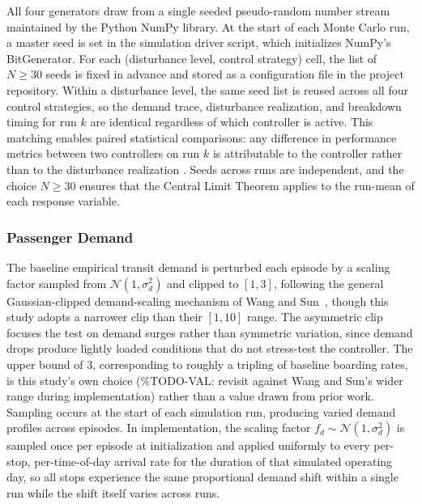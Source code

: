 All four generators draw from a single seeded pseudo-random number stream maintained by the Python NumPy library. At the start of each Monte Carlo run, a master seed is set in the simulation driver script, which initializes NumPy's BitGenerator. For each (disturbance level, control strategy) cell, the list of $N \geq 30$ seeds is fixed in advance and stored as a configuration file in the project repository. Within a disturbance level, the same seed list is reused across all four control strategies, so the demand trace, disturbance realization, and breakdown timing for run $k$ are identical regardless of which controller is active. This matching enables paired statistical comparisons: any difference in performance metrics between two controllers on run $k$ is attributable to the controller rather than to the disturbance realization \cite{Henderson2018Matters}. Seeds across runs are independent, and the choice $N \geq 30$ ensures that the Central Limit Theorem applies to the run-mean of each response variable. %

\subsubsection{Passenger Demand}

The baseline empirical transit demand is perturbed each episode by a scaling factor sampled from $\mathcal{N}(1, \sigma_d^2)$ and clipped to $[1, 3]$, following the general Gaussian-clipped demand-scaling mechanism of Wang and Sun~\cite{Wangsun}, though this study adopts a narrower clip than their $[1, 10]$ range. The asymmetric clip focuses the test on demand surges rather than symmetric variation, since demand drops produce lightly loaded conditions that do not stress-test the controller. The upper bound of 3, corresponding to roughly a tripling of baseline boarding rates, is this study's own choice (\%TODO-VAL: revisit against Wang and Sun's wider range during implementation) rather than a value drawn from prior work. Sampling occurs at the start of each simulation run, producing varied demand profiles across episodes. In implementation, the scaling factor $f_d \sim \mathcal{N}(1, \sigma_d^2)$ is sampled once per episode at initialization and applied uniformly to every per-stop, per-time-of-day arrival rate for the duration of that simulated operating day, so all stops experience the same proportional demand shift within a single run while the shift itself varies across runs.

